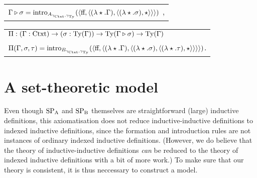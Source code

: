 \documentclass{article}
\begin{document}
\begin{description}
\begin{tabular}{l}
  $\Gamma \triangleright \sigma = \text{intro}_{A_{\gamma_{\text{Ctxt}}, \gamma_{\text{Ty}}}}(\langle \text{ff}, \langle (\lambda \star.\Gamma), \langle (\lambda \star.\sigma), \star\rangle \rangle\rangle)$ \enspace ,\\
\end{tabular}
\vskip 0.2cm
\begin{tabular}{l}
$\Pi : (\Gamma : \text{Ctxt}) \to (\sigma : \text{Ty}(\Gamma)) \to \text{Ty}(\Gamma \triangleright \sigma) \to
\text{Ty}(\Gamma)$ \\
$\Pi(\Gamma, \sigma, \tau) = \text{intro}_{B_{\gamma_{\text{Ctxt}}, \gamma_{\text{Ty}}}}(\langle \text{ff}, \langle (\lambda
    \star.\Gamma), \langle (\lambda \star.\sigma),\langle (\lambda \star. \tau) , \star\rangle\rangle \rangle\rangle)$\enspace .
\end{tabular}











\end{description}

\section{A set-theoretic model}
\label{sec:model}


Even though $\text{SP}_{\mathrm{A}}$ and $\text{SP}_{\mathrm{B}}$ themselves are straightforward (large)
inductive definitions, this axiomatisation does not reduce
inductive-inductive definitions to indexed inductive definitions,
since the formation and introduction rules are not instances of
ordinary indexed inductive definitions.  (However, we do believe that
the theory of inductive-inductive definitions \emph{can} be reduced to
the theory of indexed inductive definitions with a bit of more
work.) %
To make sure that our theory is consistent, it is thus neccessary to
construct a model.
\end{document}
